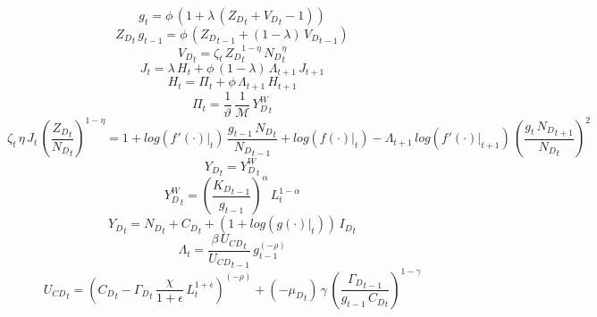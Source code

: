 \documentclass[10pt,a4paper]{article}
\begin{document}
\footnotesize
\begin{dmath}
{g}_{t}=\phi\, \left(1+\lambda\, \left({Z_D}_{t}+{V_D}_{t}-1\right)\right)
\end{dmath}
\begin{dmath}
{Z_D}_{t}\, {g}_{t-1}=\phi\, \left({Z_D}_{t-1}+\left(1-\lambda\right)\, {V_D}_{t-1}\right)
\end{dmath}
\begin{dmath}
{V_D}_{t}={\zeta}_{t}\, {Z_D}_{t}^{1-\eta}\, {N_D}_{t}^{\eta}
\end{dmath}
\begin{dmath}
{J}_{t}=\lambda\, {H}_{t}+\phi\, \left(1-\lambda\right)\, {\Lambda}_{t+1}\, {J}_{t+1}
\end{dmath}
\begin{dmath}
{H}_{t}={\Pi}_{t}+\phi\, {\Lambda}_{t+1}\, {H}_{t+1}
\end{dmath}
\begin{dmath}
{\Pi}_{t}=\frac{1}{\vartheta}\, \frac{1}{\mathcal{M}}\, {Y^W_D}_{t}
\end{dmath}
\begin{dmath}
{\zeta}_{t}\, \eta\, {J}_{t}\, \left(\frac{{Z_D}_{t}}{{N_D}_{t}}\right)^{1-\eta}=1+log\left({\left.       f^‎{\prime}\left( \cdot \right)   \right|}_{t}\right)\, \frac{{g}_{t-1}\, {N_D}_{t}}{{N_D}_{t-1}}+log\left({\left.       f\left( \cdot \right)            \right|}_{t}\right)-{\Lambda}_{t+1}\, log\left({\left.       f^‎{\prime}\left( \cdot \right)   \right|}_{t+1}\right)\, \left(\frac{{g}_{t}\, {N_D}_{t+1}}{{N_D}_{t}}\right)^{2}
\end{dmath}
\begin{dmath}
{Y_D}_{t}={Y^W_D}_{t}
\end{dmath}
\begin{dmath}
{Y^W_D}_{t}=\left(\frac{{K_D}_{t-1}}{{g}_{t-1}}\right)^{\alpha}\, {L}_{t}^{1-\alpha}
\end{dmath}
\begin{dmath}
{Y_D}_{t}={N_D}_{t}+{C_D}_{t}+\left(1+log\left({\left.       g\left( \cdot \right)            \right|}_{t}\right)\right)\, {I_D}_{t}
\end{dmath}
\begin{dmath}
{\Lambda}_{t}=\frac{\beta\, {U_{CD}}_{t}}{{U_{CD}}_{t-1}}\, {g}_{t-1}^{\left(-\rho\right)}
\end{dmath}
\begin{dmath}
{U_{CD}}_{t}=\left({C_D}_{t}-{\Gamma_D}_{t}\, \frac{\chi}{1+\epsilon}\, {L}_{t}^{1+\epsilon}\right)^{\left(-\rho\right)}+\left(-{{\mu}_{D}}_{t}\right)\, \gamma\, \left(\frac{{\Gamma_D}_{t-1}}{{g}_{t-1}\, {C_D}_{t}}\right)^{1-\gamma}
\end{dmath}
\end{document}
